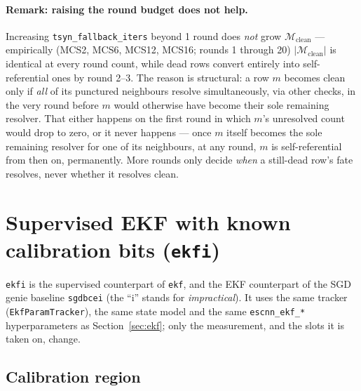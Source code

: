 \documentclass{article}
\begin{document}
\paragraph{Remark: raising the round budget does not help.} Increasing
\texttt{tsyn\_fallback\_iters} beyond 1 round does \emph{not} grow $\mathcal{M}_{\text{clean}}$
— empirically (MCS2, MCS6, MCS12, MCS16; rounds 1 through 20) $|\mathcal{M}_{\text{clean}}|$ is
identical at every round count, while dead rows convert entirely into self-referential ones by
round 2--3. The reason is structural: a row $m$ becomes clean only if \emph{all} of its
punctured neighbours resolve simultaneously, via other checks, in the very round before $m$
would otherwise have become their sole remaining resolver. That either happens on the first
round in which $m$'s unresolved count would drop to zero, or it never happens — once $m$ itself
becomes the sole remaining resolver for one of its neighbours, at any round, $m$ is
self-referential from then on, permanently. More rounds only decide \emph{when} a still-dead
row's fate resolves, never whether it resolves clean.

\section{Supervised EKF with known calibration bits (\texttt{ekfi})}
\label{sec:ekfi}

\texttt{ekfi} is the supervised counterpart of \texttt{ekf}, and the EKF counterpart of the
SGD genie baseline \texttt{sgdbcei} (the ``i'' stands for \emph{impractical}). It uses the same
tracker (\texttt{EkfParamTracker}), the same state model and the same \texttt{escnn\_ekf\_*}
hyperparameters as Section~\ref{sec:ekf}; only the measurement, and the slots it is taken on,
change.

\subsection{Calibration region}
\end{document}
